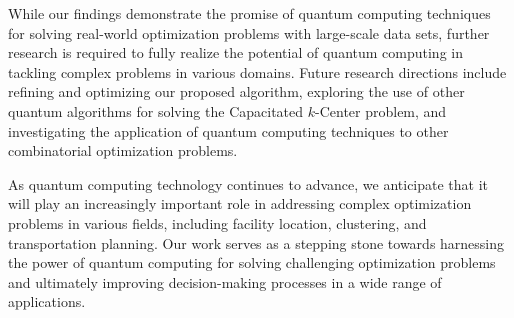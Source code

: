 While our findings demonstrate the promise of quantum computing techniques for solving real-world optimization problems with large-scale data sets, further research is required to fully realize the potential of quantum computing in tackling complex problems in various domains. Future research directions include refining and optimizing our proposed algorithm, exploring the use of other quantum algorithms for solving the Capacitated $k$-Center problem, and investigating the application of quantum computing techniques to other combinatorial optimization problems.

As quantum computing technology continues to advance, we anticipate that it will play an increasingly important role in addressing complex optimization problems in various fields, including facility location, clustering, and transportation planning. Our work serves as a stepping stone towards harnessing the power of quantum computing for solving challenging optimization problems and ultimately improving decision-making processes in a wide range of applications.

